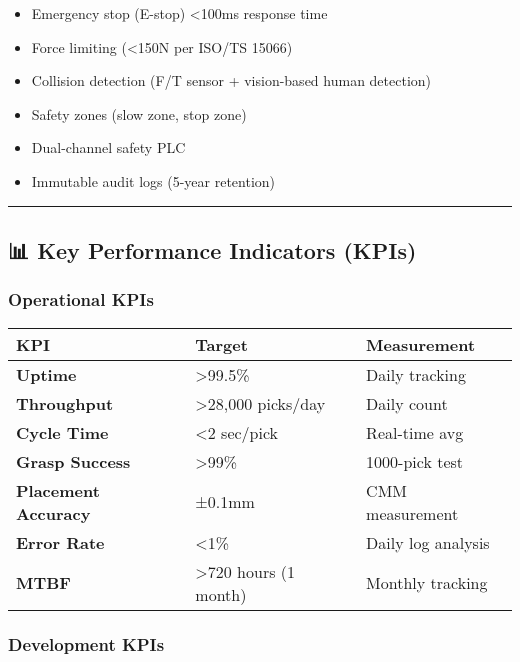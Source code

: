 \documentclass[
]{article}
\providecommand{\tightlist}{%
  \setlength{\itemsep}{0pt}\setlength{\parskip}{0pt}}
\begin{document}
\begin{itemize}
\tightlist
\item
  Emergency stop (E-stop) \textless100ms response time
\item
  Force limiting (\textless150N per ISO/TS 15066)
\item
  Collision detection (F/T sensor + vision-based human detection)
\item
  Safety zones (slow zone, stop zone)
\item
  Dual-channel safety PLC
\item
  Immutable audit logs (5-year retention)
\end{itemize}

\begin{center}\rule{0.5\linewidth}{0.5pt}\end{center}

\hypertarget{key-performance-indicators-kpis}{%
\subsection{📊 Key Performance Indicators
(KPIs)}\label{key-performance-indicators-kpis}}

\hypertarget{operational-kpis}{%
\subsubsection{Operational KPIs}\label{operational-kpis}}

\begin{longtable}[]{@{}lll@{}}
\toprule\noalign{}
\textbf{KPI} & \textbf{Target} & \textbf{Measurement} \\
\midrule\noalign{}
\endhead
\bottomrule\noalign{}
\endlastfoot
\textbf{Uptime} & \textgreater99.5\% & Daily tracking \\
\textbf{Throughput} & \textgreater28,000 picks/day & Daily count \\
\textbf{Cycle Time} & \textless2 sec/pick & Real-time avg \\
\textbf{Grasp Success} & \textgreater99\% & 1000-pick test \\
\textbf{Placement Accuracy} & ±0.1mm & CMM measurement \\
\textbf{Error Rate} & \textless1\% & Daily log analysis \\
\textbf{MTBF} & \textgreater720 hours (1 month) & Monthly tracking \\
\end{longtable}

\hypertarget{development-kpis}{%
\subsubsection{Development KPIs}\label{development-kpis}}
\end{document}
